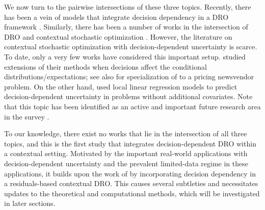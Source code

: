 \documentclass[onefignum,onetabnum]{siamart251216}
\begin{document}
We now turn to the pairwise intersections of these three topics. 
Recently, there has been a vein of models that integrate decision dependency in a DRO framework \cite[e.g.,][]{luo2020distributionally,basciftci2021distributionally,noyan2018distributionally,yu2022multistage}. 
Similarly, %
there has been a number of works in the intersection of DRO and contextual stochastic optimization \cite[e.g.,][]{bertsimas2019dynamic,kannan2020residuals,bertsimas2017bootstrap,hanasusanto2013robust}. 
However, the literature on contextual stochastic optimization with decision-dependent uncertainty is scarce.
To date, only a very few works have considered this important setup.  %
\cite{bertsimas2020predictive,bertsimas2022data} studied extensions of their methods when decisions affect the conditional distributions/expectations; see also \citep{Liu2023solving} for specialization of \citep{bertsimas2020predictive} 
to a pricing newsvendor problem. %
 On the other hand, \cite{liu2022coupled} used local linear regression models to predict decision-dependent uncertainty in problems without additional covariates. 
Note that this topic has been identified as an active and important future research area in the survey \cite{sadana2024survey}. 

To our knowledge, there exist no works that lie in the intersection of all three topics, and this is the first study that integrates decision-dependent DRO within a contextual setting. 
Motivated by the important real-world applications with decision-dependent uncertainty and the prevalent limited-data regime in these applications, it builds upon the work of \cite{kannan2025data,kannan2020residuals} by incorporating decision dependency in a residuals-based contextual DRO.  This causes several subtleties and necessitates updates to the theoretical and computational methods, which will be investigated in later sections. 

\vspace*{-0.1in}
\end{document}
